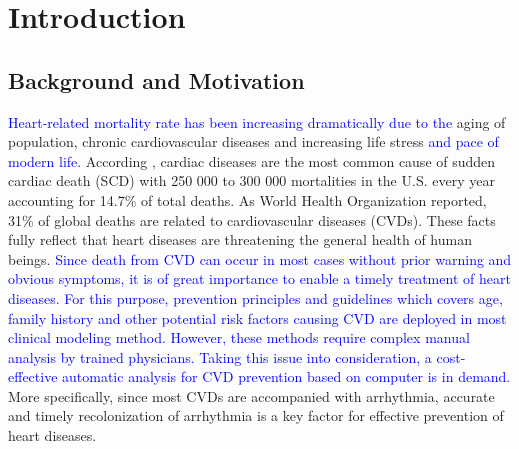  \chapter{Introduction}

 \section{Background and Motivation}
 
\textcolor{blue}{Heart-related mortality rate has been increasing dramatically due to the} aging of population, chronic cardiovascular diseases and increasing life stress \textcolor{blue}{and pace of modern life}\cite{mortality}. According \cite{SCDnumber}, %
cardiac diseases are the most common cause of sudden cardiac death (SCD) with 250 000 to 300 000 mortalities in the U.S. every year accounting for 14.7\% of total deaths\cite{SCDnumber}. As World Health Organization reported, 31\% of global deaths are related to cardiovascular diseases (CVDs)\cite{who}. %
These facts fully reflect that heart diseases are threatening the general health of human beings. %
\textcolor{blue}{Since death from CVD can occur in most cases without prior warning and obvious symptoms, it is of great importance to enable a timely treatment of heart diseases. For this purpose, prevention principles and guidelines which covers age, family history and other potential risk factors causing CVD are deployed in most clinical modeling method\cite{smith2004principles}. However, these methods require complex manual analysis by trained physicians. Taking this issue into consideration, a cost-effective automatic analysis for CVD prevention based on computer is in demand.}
More specifically, since most CVDs are accompanied with arrhythmia, accurate and timely recolonization of arrhythmia is a key factor for effective prevention of heart diseases. %

